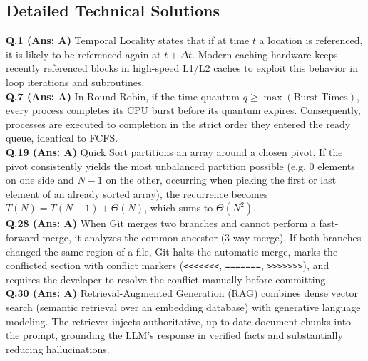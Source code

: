 \vspace{3mm}
\subsection*{Detailed Technical Solutions}

\begin{solutionbox}
\textbf{Q.1 (Ans: A)} Temporal Locality states that if at time $t$ a location is referenced, it is likely to be referenced again at $t + \Delta t$. Modern caching hardware keeps recently referenced blocks in high-speed L1/L2 caches to exploit this behavior in loop iterations and subroutines.\\[2mm]
\textbf{Q.7 (Ans: A)} In Round Robin, if the time quantum $q \ge \max(\text{Burst Times})$, every process completes its CPU burst before its quantum expires. Consequently, processes are executed to completion in the strict order they entered the ready queue, identical to FCFS.\\[2mm]
\textbf{Q.19 (Ans: A)} Quick Sort partitions an array around a chosen pivot. If the pivot consistently yields the most unbalanced partition possible (e.g. 0 elements on one side and $N-1$ on the other, occurring when picking the first or last element of an already sorted array), the recurrence becomes $T(N) = T(N-1) + \Theta(N)$, which sums to $\Theta(N^2)$.\\[2mm]
\textbf{Q.28 (Ans: A)} When Git merges two branches and cannot perform a fast-forward merge, it analyzes the common ancestor (3-way merge). If both branches changed the same region of a file, Git halts the automatic merge, marks the conflicted section with conflict markers (\texttt{<<<<<<<}, \texttt{=======}, \texttt{>>>>>>>}), and requires the developer to resolve the conflict manually before committing.\\[2mm]
\textbf{Q.30 (Ans: A)} Retrieval-Augmented Generation (RAG) combines dense vector search (semantic retrieval over an embedding database) with generative language modeling. The retriever injects authoritative, up-to-date document chunks into the prompt, grounding the LLM's response in verified facts and substantially reducing hallucinations.
\end{solutionbox}

\newpage
